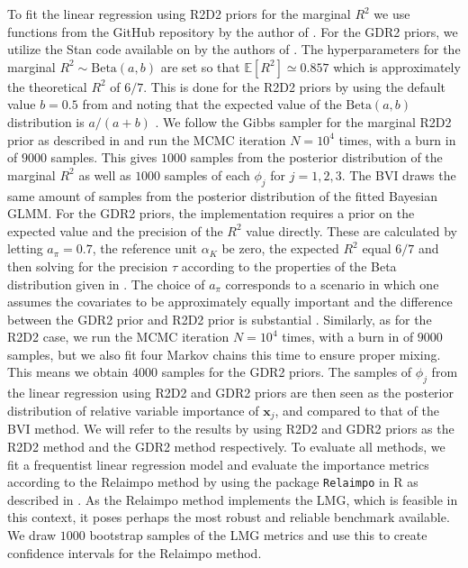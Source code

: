 \noindent To fit the linear regression using R2D2 priors for the marginal $R^2$ we use functions from the GitHub repository \citet{zhang2024r2d2_git} by the author of \citet{zhang2020bayesian}. For the GDR2 priors, we utilize the Stan code available on \citet{aguilar2024GDR_code} by the authors of \citet{aguilar2024generalized}. The hyperparameters for the marginal $R^2 \sim \text{Beta}(a, b)$ are set so that $\mathbb{E}[R^2] \simeq 0.857$ which is approximately the theoretical $R^2$ of $6/7$. This is done for the R2D2 priors by using the default value $b=0.5$ from \citet{zhang2024r2d2_git} and noting that the expected value of the $\text{Beta}(a, b)$ distribution is $a/(a+b)$ \citep{stats_book}. We follow the Gibbs sampler for the marginal R2D2 prior as described in \citep[section 5.3]{zhang2020bayesian} and run the MCMC iteration $N=10^4$ times, with a burn in of $9000$ samples. This gives $1000$ samples from the posterior distribution of the marginal $R^2$ as well as $1000$ samples of each $\phi_j$ for $j=1, 2, 3$. The BVI draws the same amount of samples from the posterior distribution of the fitted Bayesian GLMM.
For the GDR2 priors, the implementation requires a prior on the expected value and the precision of the $R^2$ value directly. These are calculated by letting $a_{\pi}=0.7$, the reference unit $\alpha_K$ be zero, the expected $R^2$ equal $6/7$ and then solving for the precision $\tau$ according to the properties of the Beta distribution given in \citet{aguilar2024generalized}. The choice of $a_{\pi}$ corresponds to a scenario in which one assumes the covariates to be approximately equally important and the difference between the GDR2 prior and R2D2 prior is substantial \citep{aguilar2024generalized}. Similarly, as for the R2D2 case, we run the MCMC iteration $N=10^4$ times, with a burn in of $9000$ samples, but we also fit four Markov chains this time to ensure proper mixing. This means we obtain $4000$ samples for the GDR2 priors. The samples of $\phi_j$ from the linear regression using R2D2 and GDR2 priors are then seen as the posterior distribution of relative variable importance of $\mathbf{x}_j$, and compared to that of the BVI method. We will refer to the results by using R2D2 and GDR2 priors as the R2D2 method and the GDR2 method respectively. To evaluate all methods, we fit a frequentist linear regression model and evaluate the importance metrics according to the Relaimpo method by using the package \texttt{Relaimpo} \citep{groemping2023relaimpo} in R as described in \citet{gromping_relaimpo}. As the Relaimpo method implements the LMG, which is feasible in this context, it poses perhaps the most robust and reliable benchmark available. We draw $1000$ bootstrap samples of the LMG metrics and use this to create confidence intervals for the Relaimpo method. 



